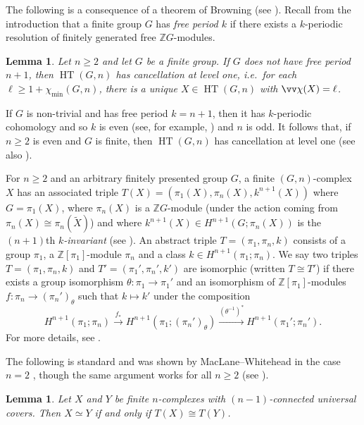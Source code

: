 \documentclass[11pt,leqno,a4paper]{amsart}
\newcommand{\Z}{\mathbb{Z}}
\DeclareMathOperator{\HT}{HT}
\newtheorem{lemma}[thm]{Lemma}
\theoremstyle{definition}
\theoremstyle{remark}
\theoremstyle{custom}
\newcommand{\wt}{\widetilde}
\begin{document}
The following is a consequence of a theorem of Browning \cite[Theorem 5.4]{Br78} (see \cite[p252]{Dy79a}). Recall from the introduction that a finite group $G$ has \textit{free period $k$} if there exists a $k$-periodic resolution of finitely generated free $\Z G$-modules. 

\begin{lemma} \label{lemma:canc-except-periodic-case}
Let $n \ge 2$ and let $G$ be a finite group. If $G$ does not have free period $n+1$, then $\HT(G,n)$ has cancellation at level one, i.e.~for each $\ell \ge 1+\chi_{\min}(G,n)$, there is a unique $X \in \HT(G,n)$ with $\vv\chi(X) = \ell$.   
\end{lemma}

If $G$ is non-trivial and has free period $k=n+1$, then it has $k$-periodic cohomology and so $k$ is even (see, for example, \cite[Proposition 40.2]{Jo03a}) and $n$ is odd. It follows that, if $n \ge 2$ is even and $G$ is finite, then $\HT(G,n)$ has cancellation at level one (see also \cite[Corollary 4.7]{Ni20a}).

For $n \ge 2$ and an arbitrary finitely presented group $G$, a finite $(G,n)$-complex $X$ has an associated triple $T(X) = (\pi_1(X), \pi_n(X),k^{n+1}(X))$ where $G=\pi_1(X)$, where $\pi_n(X)$ is a $\Z G$-module (under the action coming from $\pi_n(X) \cong \pi_n(\wt X)$) and where $k^{n+1}(X) \in H^{n+1}(G;\pi_n(X))$ is the $(n+1)$th \textit{$k$-invariant} (see \cite{MW50,Dy76}). 
An abstract triple $T = (\pi_1,\pi_n,k)$ consists of a group $\pi_1$, a $\Z[\pi_1]$-module $\pi_n$ and a class $k \in H^{n+1}(\pi_1;\pi_n)$. We say two triples $T = (\pi_1,\pi_n,k)$ and $T' = (\pi_1',\pi_n',k')$ are isomorphic (written $T \cong T'$) if there exists a group isomorphism $\theta : \pi_1 \to \pi_1'$ and an isomorphism of $\Z[\pi_1]$-modules $f:\pi_n \to (\pi_n')_\theta$ such that $k \mapsto k'$ under the composition
\[ H^{n+1}(\pi_1;\pi_n) \xrightarrow[]{f_*} H^{n+1}(\pi_1;(\pi_n')_\theta) \xrightarrow[]{(\theta^{-1})^*} H^{n+1}(\pi_1';\pi_n'). \]
For more details, see \cite[p250]{Dy76}.

The following is standard and was shown by MacLane--Whitehead in the case $n=2$ \cite[Theorem 1]{MW50}, though the same argument works for all $n \ge 2$ (see \cite[p250]{Dy76}).

\begin{lemma} \label{lemma:triples}
Let $X$ and $Y$ be finite $n$-complexes with $(n-1)$-connected universal covers. Then $X \simeq Y$ if and only if $T(X) \cong T(Y)$.    
\end{lemma}
\end{document}
